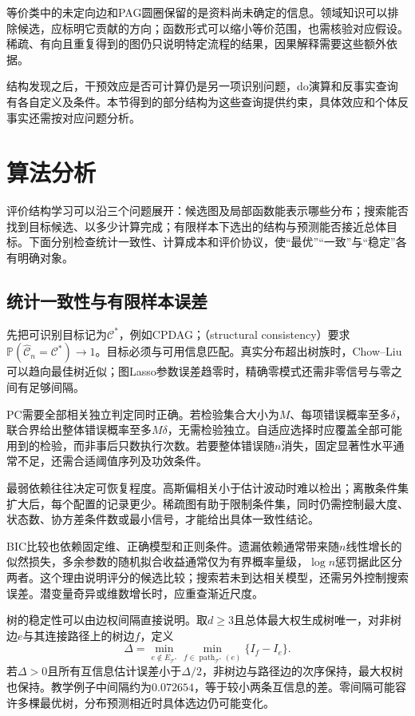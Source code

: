 等价类中的未定向边和PAG圆圈保留的是资料尚未确定的信息。领域知识可以排除候选，应标明它贡献的方向；函数形式可以缩小等价范围，也需核验对应假设。稀疏、有向且重复得到的图仍只说明特定流程的结果，因果解释需要这些额外依据。

结构发现之后，干预效应是否可计算仍是另一项识别问题，do演算和反事实查询有各自定义及条件。本节得到的部分结构为这些查询提供约束，具体效应和个体反事实还需按对应问题分析。

\section{算法分析}
\label{sec:pgm-structure-learning-analysis}

评价结构学习可以沿三个问题展开：候选图及局部函数能表示哪些分布；搜索能否找到目标候选、以多少计算完成；有限样本下选出的结构与预测能否接近总体目标。下面分别检查统计一致性、计算成本和评价协议，使“最优”“一致”与“稳定”各有明确对象。

\subsection{统计一致性与有限样本误差}
\label{sec:pgm-structure-learning-consistency}

先把可识别目标记为$\mathcal{C}^{*}$，例如CPDAG；（structural consistency）要求$\mathbb{P}(\widehat{\mathcal{C}}_n=\mathcal{C}^{*})\to1$。目标必须与可用信息匹配。真实分布超出树族时，Chow--Liu可以趋向最佳树近似；图Lasso参数误差趋零时，精确零模式还需非零信号与零之间有足够间隔。

PC需要全部相关独立判定同时正确。若检验集合大小为$M$、每项错误概率至多$\delta$，联合界给出整体错误概率至多$M\delta$，无需检验独立。自适应选择时应覆盖全部可能用到的检验，而非事后只数执行次数。若要整体错误随$n$消失，固定显著性水平通常不足，还需合适阈值序列及功效条件。

最弱依赖往往决定可恢复程度。高斯偏相关小于估计波动时难以检出；离散条件集扩大后，每个配置的记录更少。稀疏图有助于限制条件集，同时仍需控制最大度、状态数、协方差条件数或最小信号，才能给出具体一致性结论。

BIC比较也依赖固定维、正确模型和正则条件。遗漏依赖通常带来随$n$线性增长的似然损失，多余参数的随机拟合收益通常仅为有界概率量级，$\log n$惩罚据此区分两者。这个理由说明评分的候选比较；搜索若未到达相关模型，还需另外控制搜索误差。潜变量奇异或维数增长时，应重查渐近尺度。

树的稳定性可以由边权间隔直接说明。取$d\geq3$且总体最大权生成树唯一，对非树边$e$与其连接路径上的树边$f$，定义
\[
  \Delta=\min_{e\notin E_{\mathcal{T}^{*}}}
             \min_{f\in\operatorname{path}_{\mathcal{T}^{*}}(e)}
             \{I_f-I_e\}.
\]
若$\Delta>0$且所有互信息估计误差小于$\Delta/2$，非树边与路径边的次序保持，最大权树也保持。教学例子中间隔约为$0.072654$，等于较小两条互信息的差。零间隔可能容许多棵最优树，分布预测相近时具体选边仍可能变化。

